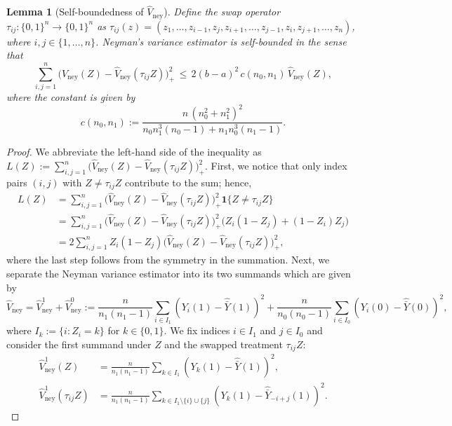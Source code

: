 \documentclass[aos]{imsart2}
\theoremstyle{plain}
\newtheorem{lemma}[theorem]{Lemma}
\theoremstyle{definition}
\newcommand{\one}{\mathbf{1}}
\newcommand{\ybh}{\hat{\bar{Y}}}
\newcommand{\vhn}{\hat{V}_{\mathrm{ney}}}
\begin{document}
\begin{appendix}
\begin{lemma}[Self-boundedness of $\vhn$]\label{lem:self-bounded}
	Define the swap operator $\tau_{ij}\colon \{0,1\}^n \to \{0,1\}^n$ as
    		$\tau_{ij}(z) = (z_1,\ldots, z_{i-1},z_j,z_{i+1},\ldots, z_{j-1}, z_i, z_{j+1},\ldots,z_n)$,
	where $i,j\in\{1,\ldots,n\}$. Neyman's variance estimator is self-bounded in the sense that
	\begin{equation*}
		\sum_{i,j=1}^n \big(\vhn(Z)-\vhn(\tau_{ij}Z)\big)_+^2\, \leq\, 2 (b-a)^2\,c(n_0,n_1)\, \vhn(Z),
	\end{equation*}
	where the constant is given by
	\begin{equation*}
		c(n_0,n_1) := \frac{n\,(n_0^2+n_1^2)^2}{n_0n_1^3(n_0-1) + n_1 n_0^3(n_1-1)}.%
	\end{equation*}
\end{lemma}
\begin{proof}
	We abbreviate the left-hand side of the inequality as $L(Z) := \sum_{i,j=1}^n \big(\vhn(Z)-\vhn(\tau_{ij}Z)\big)_+^2$. First, we notice that only index pairs $(i,j)$ with $Z \neq \tau_{ij} Z$ contribute to the sum; hence,
	\begin{align*}
		L(Z) &= \sum_{i,j=1}^n \big(\vhn(Z)-\vhn(\tau_{ij}Z)\big)_+^2 \one \{Z \neq \tau_{ij} Z\}\\
		&= \sum_{i,j=1}^n \big(\vhn(Z)-\vhn(\tau_{ij}Z)\big)_+^2 \Big(Z_i (1-Z_j) + (1-Z_i)Z_j\Big)\\
		&= 2\sum_{i,j=1}^n Z_i (1-Z_j) \big(\vhn(Z)-\vhn(\tau_{ij}Z)\big)_+^2,
	\end{align*}
	where the last step follows from the symmetry in the summation. Next, we separate the Neyman variance estimator into its two summands which are given by
    \begin{equation*}
        \vhn = \vhn^1+\vhn^0 := \frac{n}{n_1(n_1-1)}\sum_{i \in I_1} (Y_i(1)-\ybh(1))^2 + \frac{n}{n_0(n_0-1)}\sum_{i \in I_0} (Y_i(0)-\ybh(0))^2,
    \end{equation*}
    where $I_k := \{i\colon Z_i=k\}$ for $k\in \{0,1\}$. We fix indices $i\in I_1$ and $j \in I_0$ and consider the first summand under $Z$ and the swapped treatment $\tau_{ij}Z$:
    \begin{align*}
        \vhn^1(Z) &= \frac{n}{n_1(n_1-1)}\sum_{k \in I_1} (Y_k(1)-\ybh(1))^2,\\
        \vhn^1(\tau_{ij}Z) &= \frac{n}{n_1(n_1-1)}\sum_{k \in I_1 \setminus \{i\} \cup \{j\}} (Y_k(1)-\ybh_{-i+j}(1))^2.

\end{align*}
\end{proof}
\end{appendix}
\end{document}
